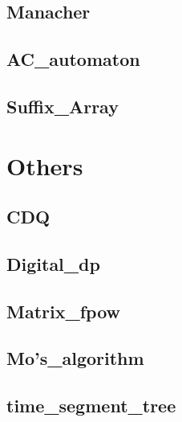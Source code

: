     \subsection{Manacher}
        
    \subsection{AC\_automaton}
        
    \subsection{Suffix\_Array}
        

\section{Others}
    \subsection{CDQ}
        
    \subsection{Digital\_dp}
        
    \subsection{Matrix\_fpow}
        
    \subsection{Mo's\_algorithm}
        
    \subsection{time\_segment\_tree}
        
    